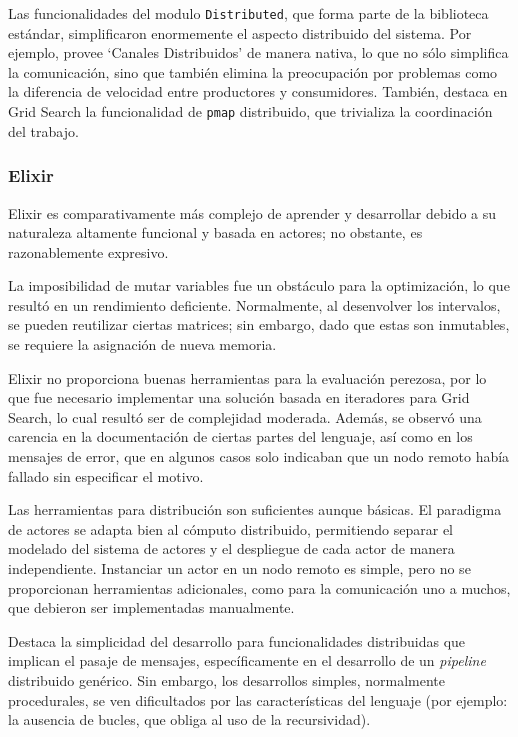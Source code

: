 \documentclass[11pt]{article}
\let\Oldsubsubsection\subsubsection
\renewcommand{\subsubsection}{\FloatBarrier\Oldsubsubsection}
\begin{document}
Las funcionalidades del modulo \lstinline{Distributed}, que forma parte de la biblioteca estándar, simplificaron enormemente el aspecto distribuido del sistema. Por ejemplo, provee ‘Canales Distribuidos’ de manera nativa, lo que no sólo simplifica la comunicación, sino que también elimina la preocupación por problemas como la diferencia de velocidad entre productores y consumidores. También, destaca en Grid Search la funcionalidad de \lstinline{pmap} distribuido, que trivializa la coordinación del trabajo.

\subsubsection{Elixir}

Elixir es comparativamente más complejo de aprender y desarrollar debido a su naturaleza altamente funcional y basada en actores; no obstante, es razonablemente expresivo.

La imposibilidad de mutar variables fue un obstáculo para la optimización, lo que resultó en un rendimiento deficiente. Normalmente, al desenvolver los intervalos, se pueden reutilizar ciertas matrices; sin embargo, dado que estas son inmutables, se requiere la asignación de nueva memoria.

Elixir no proporciona buenas herramientas para la evaluación perezosa, por lo que fue necesario implementar una solución basada en iteradores para Grid Search, lo cual resultó ser de complejidad moderada. Además, se observó una carencia en la documentación de ciertas partes del lenguaje, así como en los mensajes de error, que en algunos casos solo indicaban que un nodo remoto había fallado sin especificar el motivo.

Las herramientas para distribución son suficientes aunque básicas. El paradigma de actores se adapta bien al cómputo distribuido, permitiendo separar el modelado del sistema de actores y el despliegue de cada actor de manera independiente. Instanciar un actor en un nodo remoto es simple, pero no se proporcionan herramientas adicionales, como para la comunicación uno a muchos, que debieron ser implementadas manualmente.

Destaca la simplicidad del desarrollo para funcionalidades distribuidas que implican el pasaje de mensajes, específicamente en el desarrollo de un \textit{pipeline} distribuido genérico. Sin embargo, los desarrollos simples, normalmente procedurales, se ven dificultados por las características del lenguaje (por ejemplo: la ausencia de bucles, que obliga al uso de la recursividad).
\end{document}
